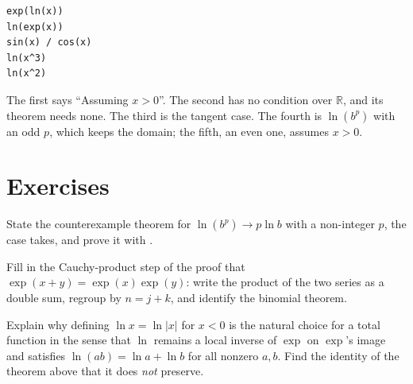 \begin{trybox}
\begin{verbatim}
exp(ln(x))
ln(exp(x))
sin(x) / cos(x)
ln(x^3)
ln(x^2)
\end{verbatim}
  The first says ``Assuming $x > 0$''. The second has no condition over $\mathbb{R}$, and its
  theorem needs none. The third is the tangent case. The fourth is $\ln(b^p)$ with an odd $p$,
  which keeps the domain; the fifth, an even one, assumes $x > 0$.
\end{trybox}

\section{Exercises}

\begin{exercisebox}
  State the counterexample theorem for $\ln(b^p) \to p \ln b$ with a non-integer $p$, the case
   takes, and prove it with .
\end{exercisebox}

\begin{exercisebox}
  Fill in the Cauchy-product step of the proof that $\exp(x+y) = \exp(x)\exp(y)$: write the
  product of the two series as a double sum, regroup by $n = j + k$, and identify the binomial
  theorem.
\end{exercisebox}

\begin{exercisebox}[Evenness]
  Explain why defining $\ln x = \ln |x|$ for $x < 0$ is the natural choice for a total function
  in the sense that $\ln$ remains a local inverse of $\exp$ on $\exp$'s image and satisfies
  $\ln(ab) = \ln a + \ln b$ for all nonzero $a, b$. Find the identity of the theorem above that
  it does \emph{not} preserve.
\end{exercisebox}
